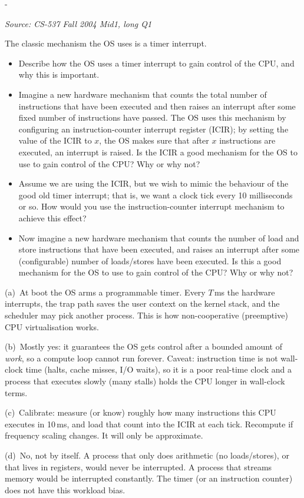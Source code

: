 \documentclass[11pt,a4paper]{article}
\makeatletter
\newcommand{\keepspace}[1]{\par\penalty-100\begingroup
  \setlength{\dimen@}{#1}\dimen@ii\pagegoal\advance\dimen@ii-\pagetotal
  \ifdim\dimen@>\dimen@ii\ifdim\dimen@ii>\z@\vfil\fi\break\fi\endgroup}
\newcounter{qn}[section]
\newenvironment{Qn}[4]{%
  \refstepcounter{qn}\keepspace{7\baselineskip}%
  \begin{tcolorbox}[qboxstyle, title={Q\thesection.\theqn\ \ [#1 \textbar\ #2]\ \ #4}]%
  {\footnotesize\color{g3}\textit{Source: #3}}\par\smallskip%
}{%
  \end{tcolorbox}%
}
\newenvironment{Sol}{%
  \begin{tcolorbox}[sboxstyle, title={Solution}]%
}{%
  \end{tcolorbox}\vspace{0.35em}%
}
\makeatother
\begin{document}
\begin{Qn}{Medium-Hard}{Lect 4}{CS-537 Fall 2004 Mid1, long Q1}{Timer interrupt vs.\ an instruction-counter interrupt}
The classic mechanism the OS uses is a timer interrupt.
\begin{itemize}
  \item[(a)] Describe how the OS uses a timer interrupt to gain control of the CPU, and why this is important.
  \item[(b)] Imagine a new hardware mechanism that counts the total number of instructions that have been executed and then raises an interrupt after some fixed number of instructions have passed. The OS uses this mechanism by configuring an instruction-counter interrupt register (ICIR); by setting the value of the ICIR to $x$, the OS makes sure that after $x$ instructions are executed, an interrupt is raised. Is the ICIR a good mechanism for the OS to use to gain control of the CPU? Why or why not?
  \item[(c)] Assume we are using the ICIR, but we wish to mimic the behaviour of the good old timer interrupt; that is, we want a clock tick every 10 milliseconds or so. How would you use the instruction-counter interrupt mechanism to achieve this effect?
  \item[(d)] Now imagine a new hardware mechanism that counts the number of load and store instructions that have been executed, and raises an interrupt after some (configurable) number of loads/stores have been executed. Is this a good mechanism for the OS to use to gain control of the CPU? Why or why not?
\end{itemize}
\end{Qn}
\begin{Sol}
(a)~At boot the OS arms a programmable timer. Every $T$\,ms the hardware interrupts, the trap path saves the user context on the kernel stack, and the scheduler may pick another process. This is how non-cooperative (preemptive) CPU virtualisation works.

(b)~Mostly yes: it guarantees the OS gets control after a bounded amount of \emph{work}, so a compute loop cannot run forever. Caveat: instruction time is not wall-clock time (halts, cache misses, I/O waits), so it is a poor real-time clock and a process that executes slowly (many stalls) holds the CPU longer in wall-clock terms.

(c)~Calibrate: measure (or know) roughly how many instructions this CPU executes in 10\,ms, and load that count into the ICIR at each tick. Recompute if frequency scaling changes. It will only be approximate.

(d)~No, not by itself. A process that only does arithmetic (no loads/stores), or that lives in registers, would never be interrupted. A process that streams memory would be interrupted constantly. The timer (or an instruction counter) does not have this workload bias.
\end{Sol}
\end{document}
